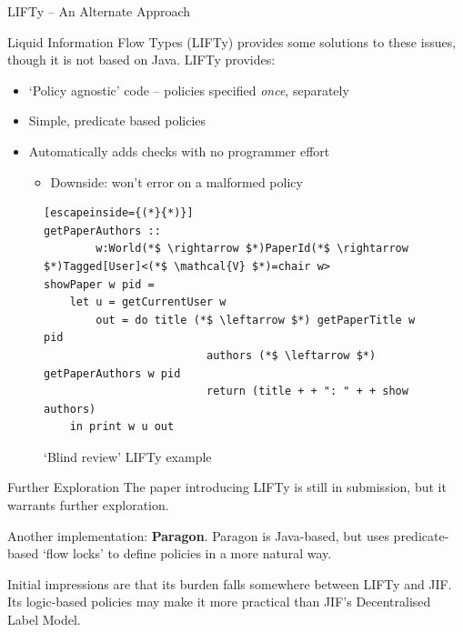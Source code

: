 \begin{frame}[fragile]{LIFTy -- An Alternate Approach}
	
	Liquid Information Flow Types (LIFTy) provides some solutions to these issues, though it is not based on Java. LIFTy provides:
	
	\begin{itemize}
		\item `Policy agnostic' code -- policies specified \textit{once}, separately
		\item Simple, predicate based policies
		\item Automatically adds checks with no programmer effort
		\begin{itemize}
			\item Downside: won't error on a malformed policy
		\end{itemize}
	\end{itemize}
	
	\begin{figure}
		\begin{lstlisting}[escapeinside={(*}{*)}]
getPaperAuthors :: 
		w:World(*$ \rightarrow $*)PaperId(*$ \rightarrow $*)Tagged[User]<(*$ \mathcal{V} $*)=chair w>
showPaper w pid =
	let u = getCurrentUser w
		out = do title (*$ \leftarrow $*) getPaperTitle w pid
						 authors (*$ \leftarrow $*) getPaperAuthors w pid
						 return (title + + ": " + + show authors)
	in print w u out

		\end{lstlisting}
		\caption{`Blind review' LIFTy example \cite{work:lifty}}
	\end{figure}
	
	
\end{frame}

\begin{frame}{Further Exploration}
	The paper introducing LIFTy is still in submission, but it warrants further exploration.
	
	Another implementation: \textbf{Paragon}. Paragon is Java-based, but uses predicate-based `flow locks' to define policies in a more natural way.
	
	Initial impressions are that its burden falls somewhere between LIFTy and JIF. Its logic-based policies may make it more practical than JIF's Decentralised Label Model.
\end{frame}

